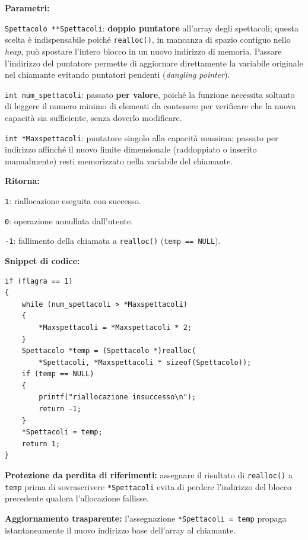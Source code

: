 \documentclass[11pt,a4paper,oneside,openany]{book}
\newenvironment{listacomp}{%
    \small
    \begin{list}{\textendash}{%
        \setlength{\topsep}{2pt}%
        \setlength{\partopsep}{0pt}%
        \setlength{\itemsep}{1pt}%
        \setlength{\parsep}{0pt}%
        \setlength{\leftmargin}{1.2em}%
    }%
}{%
    \end{list}%
}
\begin{document}
\noindent\textbf{Parametri:}
\begin{listacomp}
    \item \texttt{Spettacolo **Spettacoli}: \textbf{doppio puntatore} all'array degli spettacoli; questa scelta è indispensabile poiché \texttt{realloc()}, in mancanza di spazio contiguo nello \emph{heap}, può spostare l'intero blocco in un nuovo indirizzo di memoria. Passare l'indirizzo del puntatore permette di aggiornare direttamente la variabile originale nel chiamante evitando puntatori pendenti (\emph{dangling pointer}).
    \item \texttt{int num\_spettacoli}: passato \textbf{per valore}, poiché la funzione necessita soltanto di leggere il numero minimo di elementi da contenere per verificare che la nuova capacità sia sufficiente, senza doverlo modificare.
    \item \texttt{int *Maxspettacoli}: puntatore singolo alla capacità massima; passato per indirizzo affinché il nuovo limite dimensionale (raddoppiato o inserito manualmente) resti memorizzato nella variabile del chiamante.
\end{listacomp}

\noindent\textbf{Ritorna:}
\begin{listacomp}
    \item \texttt{1}: riallocazione eseguita con successo.
    \item \texttt{0}: operazione annullata dall'utente.
    \item \texttt{-1}: fallimento della chiamata a \texttt{realloc()} (\texttt{temp == NULL}).
\end{listacomp}

\begin{samepage}
\noindent\textbf{Snippet di codice:}
\begin{lstlisting}[caption={Ridimensionamento sicuro tramite puntatore temporaneo in riallocazioneSp()}]
if (flagra == 1)
{
    while (num_spettacoli > *Maxspettacoli)
    {
        *Maxspettacoli = *Maxspettacoli * 2;
    }
    Spettacolo *temp = (Spettacolo *)realloc(
        *Spettacoli, *Maxspettacoli * sizeof(Spettacolo));
    if (temp == NULL)
    {
        printf("riallocazione insuccesso\n");
        return -1;
    }
    *Spettacoli = temp;
    return 1;
}
\end{lstlisting}

\begin{listacomp}
    \item \textbf{Protezione da perdita di riferimenti:} assegnare il risultato di \texttt{realloc()} a \texttt{temp} prima di sovrascrivere \texttt{*Spettacoli} evita di perdere l'indirizzo del blocco precedente qualora l'allocazione fallisse.
    \item \textbf{Aggiornamento trasparente:} l'assegnazione \texttt{*Spettacoli = temp} propaga istantaneamente il nuovo indirizzo base dell'array al chiamante.
\end{listacomp}
\end{samepage}
\end{document}
